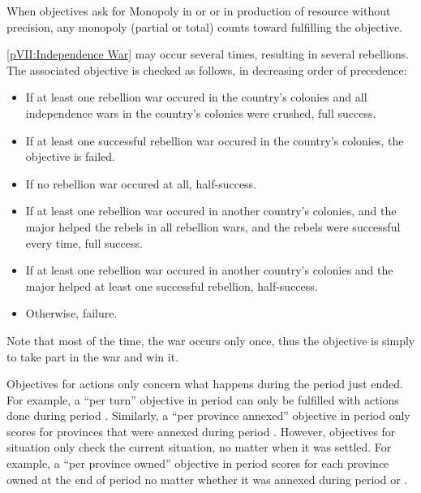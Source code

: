  When objectives ask for Monopoly in \STZ
or \CTZ or in production of resource without precision, any monopoly
(partial or total) counts toward fulfilling the objective.

 \label{chVictories:Explanation:Independence}
\ref{pVII:Independence War} may occur several times, resulting in several
rebellions. The associated objective is checked as follows, in
decreasing order of precedence:
\begin{itemize}
\item If at least one rebellion war occured in the country's colonies
  and all independence wars in the country's colonies were crushed, full
  success.
\item If at least one successful rebellion war occured in the country's
  colonies, the objective is failed.
\item If no rebellion war occured at all, half-success.
\item If at least one rebellion war occured in another country's
  colonies, and the major helped the rebels in all rebellion wars, and
  the rebels were successful every time, full success.
\item If at least one rebellion war occured in another country's
  colonies and the major helped at least one successful rebellion,
  half-success.
\item Otherwise, failure.
\end{itemize}
\bparag Note that most of the time, the war occurs only once, thus the
objective is simply to take part in the war and win it.

\aparag[Duration.] Objectives for actions only concern what happens
during the period just ended.
\bparag For example, a ``per turn'' objective in period  can
only be fulfilled with actions done during period
.
\bparag Similarly, a ``per province annexed'' objective in period
 only scores \VPs for provinces that were annexed during
period .
\bparag However, objectives for situation only check the current
situation, no matter when it was settled.
\bparag For example, a ``per province owned'' objective in period
 scores for each province owned at the end of period
 no matter whether it was annexed during period  or
.

